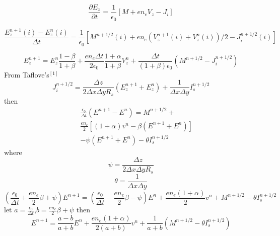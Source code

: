 \documentclass[a4paper,10pt]{article}
\begin{document}
\begin{equation}\label{eqEzS}
\frac{\partial E_{z}}{\partial t}=\frac{1}{\epsilon_{0}}\left[M+e n_{e}V_{z}-J_i\right]
\end{equation}

\begin{equation}
\frac{E_{z}^{n+1}(i)-E_{z}^{n}(i)}{\Delta t}=\frac{1}{\epsilon_{0}}\left[M^{n+1/2}(i)+e n_{e}(V^{n+1}_{z}(i)+V^{n}_{z}(i))/2-J_{i}^{n+1/2}(i)\right]
\end{equation}

\begin{equation}
E_{z}^{n+1}=E_{z}^{n}\frac{1-\beta}{1+\beta}+\frac{e n_{e}\Delta t}{2\epsilon_{0}}\frac{1+\alpha}{1+\beta}V_{z}^{n}+\frac{\Delta t}{(1+\beta)\epsilon_{0}}(M^{n+1/2}-J_{i}^{n+1/2})
\end{equation}
From Taflove's$^{[1]}$
\begin{equation}
J_{i}^{n+1/2}=\frac{\Delta z}{2\Delta x \Delta y R_{s}}(E_{z}^{n+1}+E_{z}^{n})+\frac{1}{\Delta x \Delta y}I_{s}^{n+1/2}
\end{equation}
then
\begin{eqnarray}
&&\frac{\epsilon_{0}}{\Delta t}(E^{n+1}-E^n)=M^{n+1/2}+\nonumber\\
&&\frac{e n_{e}}{2}\left[(1+\alpha)v^{n}-\beta\left(E^{n+1}+E^n\right)\right]\\
&&-\psi\left(E^{n+1}+E^n\right)-\theta I_{s}^{n+1/2}\nonumber
\end{eqnarray}
where
\begin{equation}
\psi=\frac{\Delta z}{2\Delta x \Delta y R_{s}}
\end{equation}
\begin{equation}
\theta=\frac{1}{\Delta x \Delta y}
\end{equation}
\begin{equation}
(\frac{\epsilon_0}{\Delta t}+\frac{e n_e}{2}\beta+\psi)E^{n+1}=
(\frac{\epsilon_0}{\Delta t}-\frac{e n_e}{2}\beta-\psi)E^{n}
+\frac{e n_e (1+\alpha)}{2}v^n+M^{n+1/2}-\theta I_{s}^{n+1/2}
\end{equation}
let $a=\frac{\epsilon_0}{\Delta t}$,$b=\frac{e n_e}{2}\beta+\psi$ then
\begin{equation}
E^{n+1}=\frac{a-b}{a+b}E^n+\frac{e n_e (1+\alpha)}{2(a+b)}v^n+\frac{1}{a+b}(M^{n+1/2}-\theta I_{s}^{n+1/2})
\end{equation}
\end{document}

